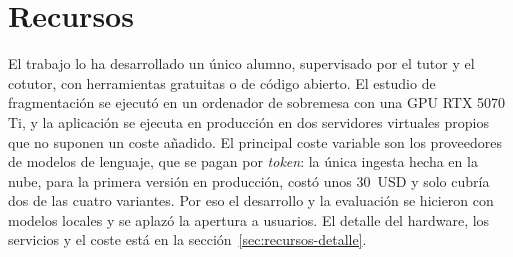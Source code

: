 \section{Recursos}
\label{sec:recursos}

El trabajo lo ha desarrollado un único alumno, supervisado por el tutor y el cotutor, con herramientas gratuitas o de código abierto. El estudio de fragmentación se ejecutó en un ordenador de sobremesa con una GPU RTX 5070 Ti, y la aplicación se ejecuta en producción en dos servidores virtuales propios que no suponen un coste añadido. El principal coste variable son los proveedores de modelos de lenguaje, que se pagan por \emph{token}: la única ingesta hecha en la nube, para la primera versión en producción, costó unos 30~USD y solo cubría dos de las cuatro variantes. Por eso el desarrollo y la evaluación se hicieron con modelos locales y se aplazó la apertura a usuarios. El detalle del hardware, los servicios y el coste está en la sección~\ref{sec:recursos-detalle}.
